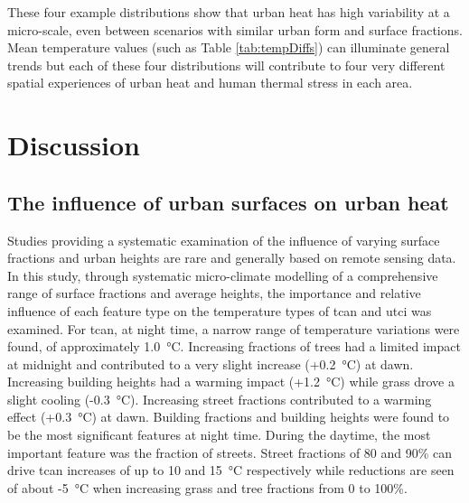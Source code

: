 \documentclass[final,3p,times,authoryear]{elsarticle}
\begin{document}
These four example distributions show that urban heat has high variability at a micro-scale, even between scenarios with similar urban form and surface fractions. Mean temperature values (such as Table \ref{tab:tempDiffs}) can illuminate general trends but each of these four distributions will contribute to four very different spatial experiences of urban heat and human thermal stress in each area.


\section{Discussion}\label{sec:discussion}

\subsection{The influence of urban surfaces on urban heat}\label{sec:discinfluence}

Studies providing a systematic examination of the influence of varying surface fractions and urban heights are rare and generally based on remote sensing data. In this study, through systematic micro-climate modelling of a comprehensive range of surface fractions and average heights, the importance and relative influence of each feature type on the temperature types of \gls{tcan} and \gls{utci} was examined. For \gls{tcan}, at night time, a narrow range of temperature variations were found, of approximately 1.0\SI{}{\degreeCelsius}. Increasing fractions of trees had a limited impact at midnight and contributed to a very slight increase (+0.2\SI{}{\degreeCelsius}) at dawn. Increasing building heights had a warming impact (+1.2\SI{}{\degreeCelsius}) while grass drove a slight cooling (-0.3\SI{}{\degreeCelsius}). Increasing street fractions contributed to a warming effect (+0.3\SI{}{\degreeCelsius}) at dawn. Building fractions and building heights were found to be the most significant features at night time. During the daytime, the most important feature was the fraction of streets. Street fractions of 80 and 90\% can drive \gls{tcan} increases of up to 10 and 15\SI{}{\degreeCelsius} respectively while reductions are seen of about -5\SI{}{\degreeCelsius} when increasing grass and tree fractions from 0 to 100\%. 
\end{document}
